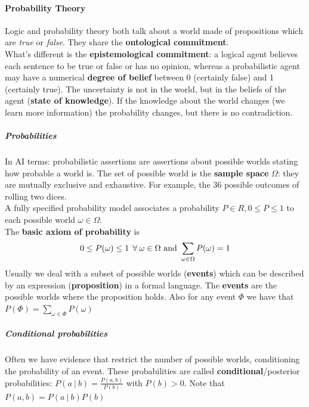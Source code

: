 \documentclass[10pt]{report}
\begin{document}
\paragraph{Probability Theory} Logic and probability theory both talk about a world made of propositions which are \textit{true} or \textit{false}. They share the \textbf{ontological commitment}.\\
What's different is the \textbf{epistemological commitment}: a logical agent believes each sentence to be true or false or has no opinion, whereas a probabilistic agent may have a numerical \textbf{degree of belief} between 0 (certainly false) and 1 (certainly true). The uncertainty is not in the world, but in the beliefs of the agent (\textbf{state of knowledge}). If the knowledge about the world changes (we learn more information) the probability changes, but there is no contradiction.
\subparagraph{Probabilities} In AI terms: probabilistic assertions are assertions about possible worlds stating how probable a world is. The set of possible world is the \textbf{sample space} $\Omega$: they are mutually exclusive and exhaustive. For example, the 36 possible outcomes of rolling two dices.\\
A fully specified probability model associates a probability $P\in R, 0\leq P \leq 1$ to each possible world $\omega\in\Omega$.\\
The \textbf{basic axiom of probability} is $$0\leq P(\omega)\leq 1\:\:\forall\:\omega\in\Omega\hbox{ and }\sum_{\omega\in\Omega} P(\omega) = 1$$
Usually we deal with a subset of possible worlds (\textbf{events}) which can be described by an expression (\textbf{proposition}) in a formal language. The \textbf{events} are the possible worlds where the proposition holds. Also for any event $\Phi$ we have that $P(\Phi) = \sum_{\omega\in\Phi} P(\omega)$
\subparagraph{Conditional probabilities} Often we have evidence that restrict the number of possible worlds, conditioning the probability of an event. These probabilities are called \textbf{conditional}/posterior probabilities: $P(a\:|\:b) = \frac{P(a,b)}{P(b)}$ with $P(b) > 0$. Note that $P(a,b)=P(a\:|\:b)P(b)$
\end{document}
